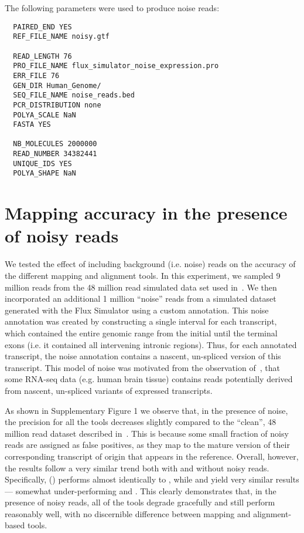 The following parameters were used to produce noise reads:	

\begin{verbatim}
  PAIRED_END YES
  REF_FILE_NAME noisy.gtf
	
  READ_LENGTH 76
  PRO_FILE_NAME flux_simulator_noise_expression.pro
  ERR_FILE 76
  GEN_DIR Human_Genome/
  SEQ_FILE_NAME noise_reads.bed
  PCR_DISTRIBUTION none
  POLYA_SCALE NaN 
  FASTA YES 
	
  NB_MOLECULES 2000000
  READ_NUMBER 34382441
  UNIQUE_IDS YES 
  POLYA_SHAPE NaN                                                                               
\end{verbatim}

\section{Mapping accuracy in the presence of noisy reads}
\label{subsec:noise}

\begin{figure*}[htb] \centering \texttt{[image: rapmap/\{Avi.RPE.supfig.1]}.pdf}
\caption{Precision, recall and F1-score (top) and FDR (bottom) on the simulated dataset with noise, for the 4 different tools we consider.}
\label{fig:noisy_read} 
\end{figure*}

We tested the effect of including background (i.e. noise) reads on the accuracy of the different mapping and alignment tools.  In this experiment, we sampled 9 million reads from the 48 million read simulated data set used in~. We then incorporated an additional 1 million ``noise'' reads from a simulated dataset generated with the Flux Simulator using a custom annotation. This noise annotation was created by constructing a single interval for each transcript, which contained the entire genomic range from the initial until the terminal exons (i.e. it contained all intervening intronic regions).  Thus, for each annotated transcript, the noise annotation contains a nascent, un-spliced version of this transcript. This model of noise was motivated from the observation of~\citep{gilbert2004elongator}, that some RNA-seq data (e.g. human brain tissue) contains reads potentially derived from nascent, un-spliced variants of expressed transcripts. 

As shown in Supplementary Figure 1 we observe that, in the presence of noise, the precision for all the tools decreases slightly compared to the ``clean'', 48 million read dataset described in~. This is because some small fraction of noisy reads are assigned as false positives, as they map to the mature version of their corresponding transcript of origin that appears in the reference. Overall, however, the results follow a very similar trend both with and without noisy reads.  Specifically, \rapmap (\qm) performs almost identically to \bt, while \kallisto and \STAR yield very similar results --- somewhat under-performing \rapmap and \bt.  This clearly demonstrates that, in the presence of noisy reads, all of the tools degrade gracefully and still perform reasonably well, with no discernible difference between mapping and alignment-based tools.

